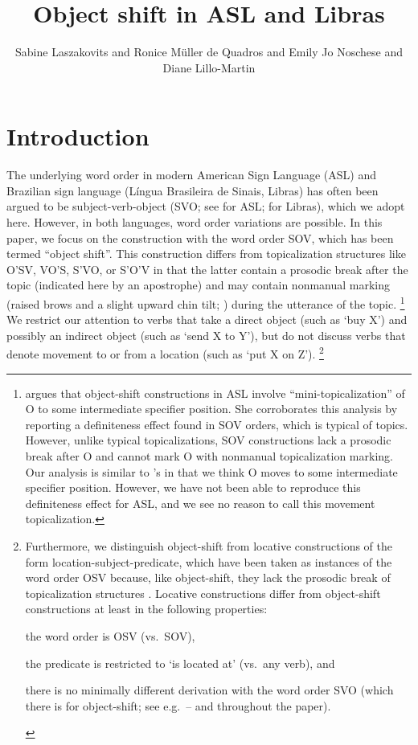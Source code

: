 \documentclass[output=paper]{langscibook}
\author{
    Sabine Laszakovits\affiliation{Austrian Academy of Sciences; University of Connecticut} and
    {Ronice Müller de} Quadros\affiliation{Universidade Federal de Santa Catarina} and 
    {Emily Jo} Noschese\affiliation{University of Hawai'i} and 
    Diane Lillo-Martin\affiliation{University of Connecticut; Haskins Laboratories}
}
\title{Object shift in ASL and Libras}
\begin{document}
\maketitle

\section{Introduction}
\label{lasz:sec:1}

The underlying word order in modern American Sign Language (ASL)
and Brazilian sign language (Língua Brasileira de Sinais, Libras) has
often been argued to be subject-verb-object (SVO; 
see \citealp{Fischer.1975,Liddell.1980,Padden.1988} for ASL; 
\citealp{Quadros.1999,Quadros.2003} for Libras), 
which we adopt here. However, in both languages, word order
variations are possible. In this paper, we focus on the construction with
the word order SOV, which has been termed ``object shift''. This
construction differs from topicalization structures like O'SV, VO'S,
S'VO, or S'O'V in that the latter contain a prosodic break after the
topic (indicated here by an apostrophe) and may contain nonmanual
marking (raised brows and a slight upward chin tilt; 
\citealp{Liddell.1977,Liddell.1980,Padden.1988}) during the utterance of the topic.%
\footnote{\citet{Fischer.1990} argues that object-shift constructions in ASL involve
    ``mini-topicalization'' of O to some intermediate specifier position. She corroborates
    this analysis by reporting a definiteness effect found in SOV orders, which is typical
    of topics. However, unlike typical topicalizations, SOV constructions lack a prosodic
    break after O and cannot mark O with nonmanual topicalization marking. Our
    analysis is similar to \citeauthor{Fischer.1990}'s in that we think O moves to some intermediate
    specifier position. However, we have not been able to reproduce this definiteness
    effect for ASL, and we see no reason to call this movement topicalization.
}
We restrict our attention to verbs that take a direct object (such as `buy X') and
possibly an indirect object (such as `send X to Y'), but do not discuss
verbs that denote movement to or from a location (such as `put X on Z').%
\footnote{Furthermore, we distinguish object-shift from locative constructions of the
    form location-subject-predicate, which have been taken as instances of the word
    order OSV because, like object-shift, they lack the prosodic break of topicalization
    structures \citep{Liddell.1980}. Locative constructions differ from object-shift
    constructions at least in the following properties: 
    \begin{inparaenum}[(i)]
        \item the word order is OSV (vs.~SOV),
        \item the predicate is restricted to `is located at' (vs.~any verb), and 
        \item there is no minimally different derivation with the word order SVO (which there is for
    object-shift; see e.g.~-- and throughout the paper).
    \end{inparaenum}
}
\end{document}
